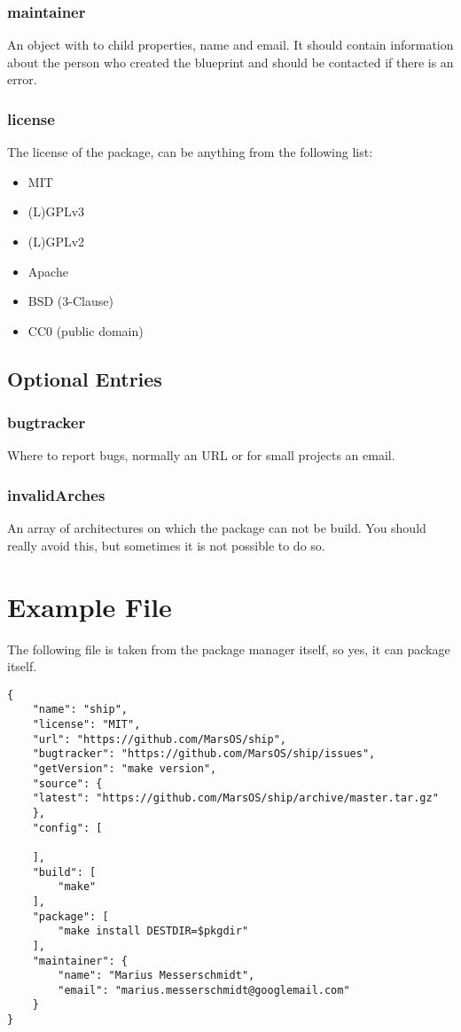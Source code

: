 \documentclass[]{article}
\begin{document}
\begin{multicols}{2}
		\subsubsection{maintainer}
		An object with to child properties, name and email. It should contain information about the person who created the blueprint and should be contacted if there is an error.
		\subsubsection{license}
		The license of the package, can be anything from the following list:
		\begin{itemize}
			\item MIT
			\item (L)GPLv3
			\item (L)GPLv2
			\item Apache
			\item BSD (3-Clause)
			\item CC0 (public domain)
		\end{itemize}
		
	\subsection{Optional Entries}
		\subsubsection{bugtracker}
		Where to report bugs, normally an URL or for small projects an email.
		\subsubsection{invalidArches}
		An array of architectures on which the package can not be build. You should really avoid this, but sometimes it is not possible to do so.

	\pagebreak

\end{multicols}

\section{Example File}
The following file is taken from the package manager itself, so yes, it can package itself.
\begin{lstlisting}
{
	"name": "ship",
	"license": "MIT",
	"url": "https://github.com/MarsOS/ship",
	"bugtracker": "https://github.com/MarsOS/ship/issues",
	"getVersion": "make version",
	"source": {
	"latest": "https://github.com/MarsOS/ship/archive/master.tar.gz"
	},
	"config": [
	
	],
	"build": [
		"make"
	],
	"package": [
		"make install DESTDIR=$pkgdir"
	],
	"maintainer": {
		"name": "Marius Messerschmidt",
		"email": "marius.messerschmidt@googlemail.com"
	}
}
\end{lstlisting}
\end{document}
